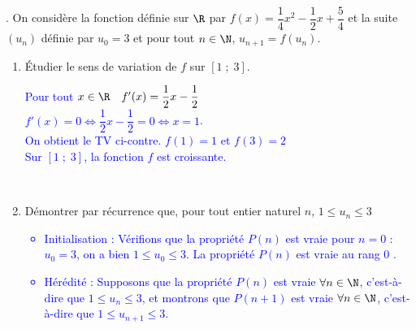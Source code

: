 \documentclass[11pt,twoside, openany]{extbook}
\begin{document}
\newpage
\begin{application}{}
. On considère la fonction définie sur $\R$ par $f(x)=\dfrac{1}{4}x^2-\dfrac{1}{2}x+\dfrac{5}{4}$ et la suite $(u_n)$ définie par $u_0 = 3$ et pour tout $n\in\N$, \quad $u_{n+1} = f(u_n)$. 
\begin{enumerate}
	\item Étudier le sens de variation de $f$ sur $[1\;;\;3]$.\vspace{0.5cm}  \\
    \textcolor{blue}{\begin{minipage}{8cm}
    Pour tout $x \in \R \quad f'(x)=\dfrac{1}{2}x-\dfrac{1}{2}$\\
    \medskip
 $f'(x)=0 \iff \dfrac{1}{2}x-\dfrac{1}{2}=0 \iff  x=1 $.\vspace{0.5em}\\ 
 On obtient le TV ci-contre. $f(1)=1$ et $f(3)=2$\\
 \medskip
 Sur $[1\;;\;3]$, la fonction $f$ est croissante.
\end{minipage} 
\hspace { 0,005 \textwidth }
\begin{minipage}{10cm} 
\begin{center}
\end{center}
\end{minipage}\\}
	\item Démontrer par récurrence que, pour tout entier naturel $n$, $1 \leqslant u_n \leqslant 3$ \\
    \textcolor{blue}{
\begin{itemize}
    \item Initialisation : Vérifions que la propriété $P(n)$ est vraie pour  $n = 0$ :\\
$u_0 = 3$, on a bien $1 \leqslant u_0 \leqslant 3$.
La propriété $P(n)$ est vraie au rang  $0$ .
    \item Hérédité : Supposons que la propriété $P(n)$ est vraie $\forall n \in \N$, c'est-à-dire que $1 \leqslant u_n \leqslant 3$, et montrons que $P(n+1)$ est vraie $\forall n \in \N$, c'est-à-dire que $1 \leqslant u_{n+1} \leqslant 3$.\\

\end{itemize}}
\end{enumerate}
\end{application}
\end{document}
